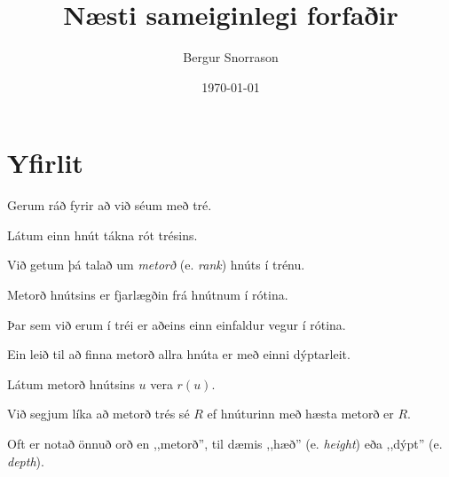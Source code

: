 \title{Næsti sameiginlegi forfaðir}
\author{Bergur Snorrason}
\date{\today}



\frame{\titlepage}

\section{Yfirlit}
{
    {
        \item<1-> Gerum ráð fyrir að við séum með tré.
        \item<2-> Látum einn hnút tákna rót trésins.
        \item<3-> Við getum þá talað um \emph{metorð} (e. \emph{rank}) hnúts í trénu.
        \item<4-> Metorð hnútsins er fjarlægðin frá hnútnum í rótina.
        \item<5-> Þar sem við erum í tréi er aðeins einn einfaldur vegur í rótina.
        \item<6-> Ein leið til að finna metorð allra hnúta er með einni dýptarleit.
        \item<7-> Látum metorð hnútsins $u$ vera $r(u)$.
        \item<8-> Við segjum líka að metorð trés sé $R$ ef hnúturinn með hæsta metorð er $R$.
        \item<9-> Oft er notað önnuð orð en ,,metorð'', til dæmis ,,hæð'' (e. \emph{height}) eða ,,dýpt'' (e. \emph{depth}).
    }
}

